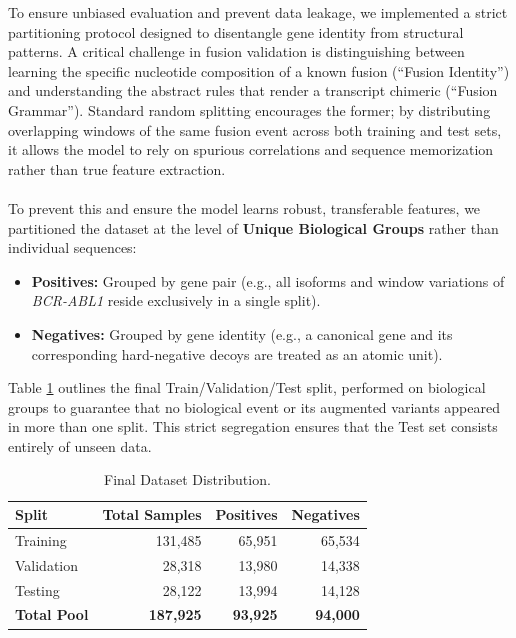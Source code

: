 \documentclass{bioinfo}
\begin{document}
To ensure unbiased evaluation and prevent data leakage, we implemented a strict partitioning protocol designed to disentangle gene identity from structural patterns. A critical challenge in fusion validation is distinguishing between learning the specific nucleotide composition of a known fusion (``Fusion Identity'') and understanding the abstract rules that render a transcript chimeric (``Fusion Grammar''). Standard random splitting encourages the former; by distributing overlapping windows of the same fusion event across both training and test sets, it allows the model to rely on spurious correlations and sequence memorization rather than true feature extraction.\\\\
To prevent this and ensure the model learns robust, transferable features, we partitioned the dataset at the level of \textbf{Unique Biological Groups} rather than individual sequences:
\begin{itemize}
    \item \textbf{Positives:} Grouped by gene pair (e.g., all isoforms and window variations of \textit{BCR-ABL1} reside exclusively in a single split).
    \item \textbf{Negatives:} Grouped by gene identity (e.g., a canonical gene and its corresponding hard-negative decoys are treated as an atomic unit).
\end{itemize}
Table \ref{table:finalds} outlines the final Train/Validation/Test split, performed on biological groups to guarantee that no biological event or its augmented variants appeared in more than one split. This strict segregation ensures that the Test set consists entirely of unseen data.

\begin{table}[!t]
    \centering
    \caption{Final Dataset Distribution.}
    \label{table:finalds}
    \begin{tabular}{lrrr}
        \toprule
        \textbf{Split} & \textbf{Total Samples} & \textbf{Positives} & \textbf{Negatives} \\
        \midrule
        Training & 131,485 & 65,951 & 65,534 \\
        Validation & 28,318 & 13,980 & 14,338 \\
        Testing & 28,122 & 13,994 & 14,128 \\
        \midrule
        \textbf{Total Pool} & \textbf{187,925} & \textbf{93,925} & \textbf{94,000} \\
        \bottomrule
    \end{tabular}
\end{table}
\end{document}
